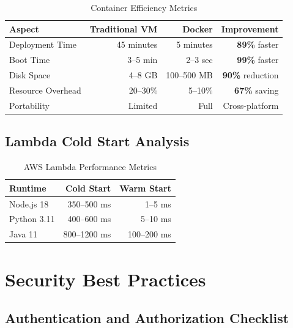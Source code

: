 \begin{table}[h]
    \centering
    \begin{tabular}{|l|r|r|r|}
        \hline
        \textbf{Aspect} & \textbf{Traditional VM} & \textbf{Docker} & \textbf{Improvement} \\
        \hline
        Deployment Time & 45 minutes & 5 minutes & \textbf{89\%} faster \\
        \hline
        Boot Time & 3--5 min & 2--3 sec & \textbf{99\%} faster \\
        \hline
        Disk Space & 4--8 GB & 100--500 MB & \textbf{90\%} reduction \\
        \hline
        Resource Overhead & 20--30\% & 5--10\% & \textbf{67\%} saving \\
        \hline
        Portability & Limited & Full & Cross-platform \\
        \hline
    \end{tabular}
    \caption{Container Efficiency Metrics}
\end{table}

\subsection{Lambda Cold Start Analysis}

\begin{table}[h]
    \centering
    \begin{tabular}{|l|r|r|}
        \hline
        \textbf{Runtime} & \textbf{Cold Start} & \textbf{Warm Start} \\
        \hline
        Node.js 18 & 350--500 ms & 1--5 ms \\
        \hline
        Python 3.11 & 400--600 ms & 5--10 ms \\
        \hline
        Java 11 & 800--1200 ms & 100--200 ms \\
        \hline
    \end{tabular}
    \caption{AWS Lambda Performance Metrics}
\end{table}

\section{Security Best Practices}

\subsection{Authentication and Authorization Checklist}

